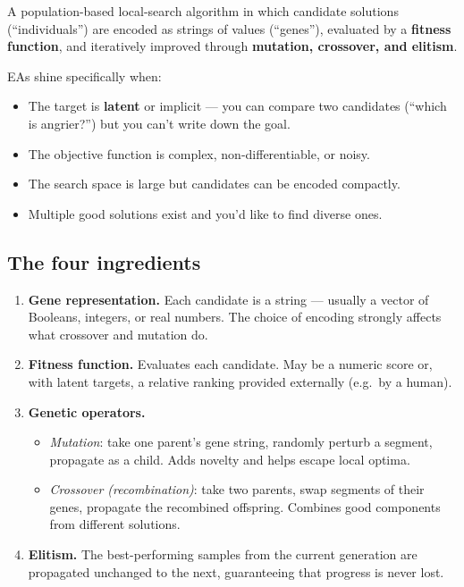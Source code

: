 \documentclass[11pt, a4paper]{article}
\begin{document}
\begin{defbox}
A population-based local-search algorithm in which candidate solutions (``individuals'') are encoded as strings of values (``genes''), evaluated by a \textbf{fitness function}, and iteratively improved through \textbf{mutation, crossover, and elitism}.
\end{defbox}

EAs shine specifically when:

\begin{itemize}
  \item The target is \textbf{latent} or implicit — you can compare two candidates (``which is angrier?'') but you can't write down the goal.
  \item The objective function is complex, non-differentiable, or noisy.
  \item The search space is large but candidates can be encoded compactly.
  \item Multiple good solutions exist and you'd like to find diverse ones.
\end{itemize}

\subsection{The four ingredients}

\begin{enumerate}
  \item \textbf{Gene representation.} Each candidate is a string — usually a vector of Booleans, integers, or real numbers. The choice of encoding strongly affects what crossover and mutation do.
  \item \textbf{Fitness function.} Evaluates each candidate. May be a numeric score or, with latent targets, a relative ranking provided externally (e.g.\ by a human).
  \item \textbf{Genetic operators.}
    \begin{itemize}[itemsep=0pt, topsep=0pt]
      \item \emph{Mutation}: take one parent's gene string, randomly perturb a segment, propagate as a child. Adds novelty and helps escape local optima.
      \item \emph{Crossover (recombination)}: take two parents, swap segments of their genes, propagate the recombined offspring. Combines good components from different solutions.
    \end{itemize}
  \item \textbf{Elitism.} The best-performing samples from the current generation are propagated unchanged to the next, guaranteeing that progress is never lost.
\end{enumerate}
\end{document}
